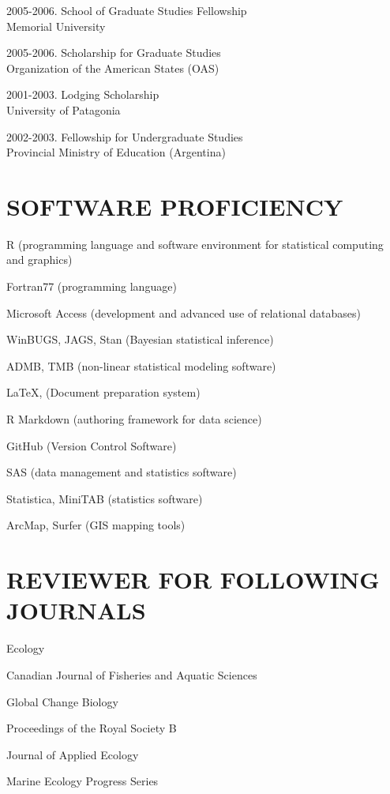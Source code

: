 \documentclass{res}
\begin{document}
\begin{resume}
\begin{hangparas}{.4in}{1}
2005-2006. School of Graduate Studies Fellowship\\
Memorial University

2005-2006. Scholarship for Graduate Studies\\
Organization of the American States (OAS)

2001-2003. Lodging Scholarship\\
University of Patagonia

2002-2003. Fellowship for Undergraduate Studies\\
Provincial Ministry of Education (Argentina)
\end{hangparas}
\section{SOFTWARE PROFICIENCY}
\vspace{0.2in} 

R (programming language and software environment for statistical computing and graphics)

Fortran77 (programming language)

Microsoft Access (development and advanced use of relational databases)

WinBUGS, JAGS, Stan (Bayesian statistical inference)

ADMB, TMB (non-linear statistical modeling software)

\LaTeX,  (Document preparation system)

R Markdown (authoring framework for data science)

GitHub (Version Control Software)

SAS (data management and statistics software)

Statistica, MiniTAB (statistics software)

ArcMap, Surfer (GIS mapping tools)



\section{REVIEWER FOR FOLLOWING JOURNALS}
\vspace{0.2in}
Ecology

Canadian Journal of Fisheries and Aquatic Sciences

Global Change Biology

Proceedings of the Royal Society B

Journal of Applied Ecology

Marine Ecology Progress Series


\end{resume}
\end{document}
